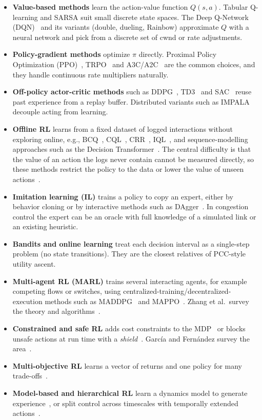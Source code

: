 \begin{itemize}
  \item \textbf{Value-based methods} learn the action-value function $Q(s,a)$. Tabular Q-learning and SARSA suit small discrete state spaces. The Deep Q-Network (DQN)~\cite{mnih2015human} and its variants (double, dueling, Rainbow) approximate $Q$ with a neural network and pick from a discrete set of cwnd or rate adjustments.
  \item \textbf{Policy-gradient methods} optimize $\pi$ directly. Proximal Policy Optimization (PPO)~\cite{schulman2017ppo}, TRPO~\cite{schulman2015trpo} and A3C/A2C~\cite{mnih2016a3c} are the common choices, and they handle continuous rate multipliers naturally.
  \item \textbf{Off-policy actor-critic methods} such as DDPG~\cite{lillicrap2016ddpg}, TD3~\cite{fujimoto2018td3} and SAC~\cite{haarnoja2018sac} reuse past experience from a replay buffer. Distributed variants such as IMPALA~\cite{espeholt2018impala} decouple acting from learning.
  \item \textbf{Offline RL} learns from a fixed dataset of logged interactions without exploring online, e.g., BCQ~\cite{fujimoto2019off}, CQL~\cite{kumar2020cql}, CRR~\cite{wang2020crr}, IQL~\cite{kostrikov2022offline}, and sequence-modelling approaches such as the Decision Transformer~\cite{chen2021decision}. The central difficulty is that the value of an action the logs never contain cannot be measured directly, so these methods restrict the policy to the data or lower the value of unseen actions~\cite{levine2020offline}.
  \item \textbf{Imitation learning (IL)} trains a policy to copy an expert, either by behavior cloning or by interactive methods such as DAgger~\cite{ross2011dagger}. In congestion control the expert can be an oracle with full knowledge of a simulated link or an existing heuristic.
  \item \textbf{Bandits and online learning} treat each decision interval as a single-step problem (no state transitions). They are the closest relatives of PCC-style utility ascent.
  \item \textbf{Multi-agent RL (MARL)} trains several interacting agents, for example competing flows or switches, using centralized-training/decentralized-execution methods such as MADDPG~\cite{lowe2017maddpg} and MAPPO~\cite{yu2022mappo}. Zhang et al.\ survey the theory and algorithms~\cite{zhang2021multi}.
  \item \textbf{Constrained and safe RL} adds cost constraints to the MDP~\cite{altman1999constrained,achiam2017constrained} or blocks unsafe actions at run time with a \emph{shield}~\cite{alshiekh2018safe}. Garc\'ia and Fern\'andez survey the area~\cite{garcia2015comprehensive}.
  \item \textbf{Multi-objective RL} learns a vector of returns and one policy for many trade-offs~\cite{hayes2022practical,abels2019dynamic}.
  \item \textbf{Model-based and hierarchical RL} learn a dynamics model to generate experience~\cite{janner2019when}, or split control across timescales with temporally extended actions~\cite{sutton1999between}.
\end{itemize}

